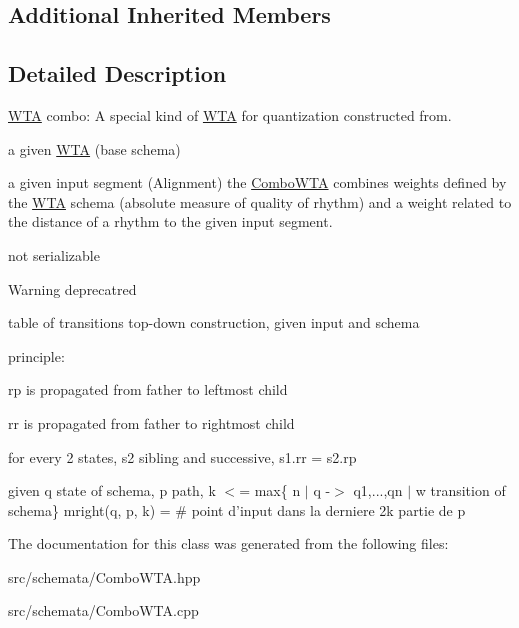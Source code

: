 \subsection*{Additional Inherited Members}


\subsection{Detailed Description}
\mbox{\hyperlink{classWTA}{W\+TA}} combo\+: A special kind of \mbox{\hyperlink{classWTA}{W\+TA}} for quantization constructed from. 


\begin{DoxyItemize}
\item a given \mbox{\hyperlink{classWTA}{W\+TA}} (base schema)
\item a given input segment (Alignment) the \mbox{\hyperlink{classComboWTA}{Combo\+W\+TA}} combines weights defined by the \mbox{\hyperlink{classWTA}{W\+TA}} schema (absolute measure of quality of rhythm) and a weight related to the distance of a rhythm to the given input segment.
\end{DoxyItemize}

not serializable

\begin{DoxyWarning}{Warning}
deprecatred
\end{DoxyWarning}
table of transitions top-\/down construction, given input and schema

principle\+:
\begin{DoxyItemize}
\item rp is propagated from father to leftmost child
\item rr is propagated from father to rightmost child
\item for every 2 states, s2 sibling and successive, s1.\+rr = s2.\+rp
\end{DoxyItemize}

given q state of schema, p path, k $<$= max\{ n $\vert$ q -\/$>$ q1,...,qn $\vert$ w transition of schema\} mright(q, p, k) = \# point d’input dans la derniere 2k partie de p 

The documentation for this class was generated from the following files\+:\begin{DoxyCompactItemize}
\item 
src/schemata/Combo\+W\+T\+A.\+hpp\item 
src/schemata/Combo\+W\+T\+A.\+cpp\end{DoxyCompactItemize}

